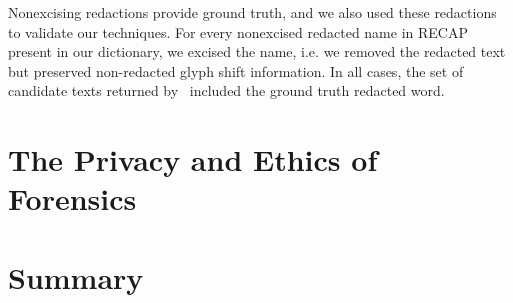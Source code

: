 Nonexcising redactions provide ground truth, and we also used these redactions to validate our techniques.
For every nonexcised redacted name in RECAP present in our dictionary, we excised the name, i.e. we removed the redacted text but preserved non-redacted glyph shift information.
In all cases, the set of candidate texts returned by \maxray\ included the ground truth redacted word.

\section{The Privacy and Ethics of Forensics}
\label{sec:redaction-ethics}

\section{Summary}

